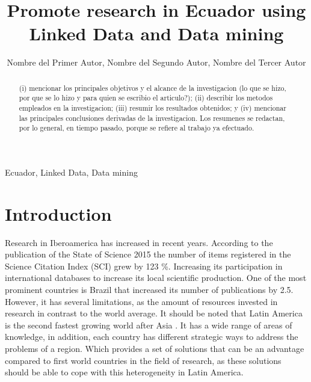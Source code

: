 \documentclass[11pt]{article}
\title{Promote research in Ecuador using Linked Data and Data mining}
\author{Nombre del Primer Autor\inst{1}, Nombre del Segundo Autor\inst{2}, Nombre del Tercer Autor\inst{1,3} }
\begin{document}
 


\renewcommand{\refname}{References}
\renewcommand{\tablename}{Table}
\renewcommand{\figurename}{Figure}

\maketitle

\begin{abstract}
(i) mencionar los principales objetivos y el alcance de la investigacion (lo que se hizo, por que se lo hizo y para quien se escribio el articulo?); (ii) describir los metodos empleados en la investigacion; (iii) resumir los resultados obtenidos; y (iv) mencionar las principales conclusiones derivadas de la investigacion. Los resumenes se redactan, por lo general, en tiempo pasado, porque se refiere al trabajo ya efectuado.
\end{abstract}

\begin{keywords}
Ecuador, Linked Data, Data mining 
\end{keywords}


\section{Introduction}
\label{sec:Intro}

Research in Iberoamerica has increased in recent years. According to the publication of the State of Science 2015 the number of items registered in the Science Citation Index (SCI)  grew by 123 \%. Increasing its participation in international databases to increase its local scientific production. One of the most prominent countries is Brazil that increased its number of publications by 2.5. However, it has several limitations, as the amount of resources invested in research in contrast to the world average. It should be noted that Latin America is the second fastest growing world after Asia \cite{Albornoz}. It has a wide range of areas of knowledge, in addition, each country has different strategic ways to address the problems of a region. Which provides a set of solutions that can be an advantage compared to first world countries in the field of research, as these solutions should be able to cope with this heterogeneity in Latin America. 
\end{document}
